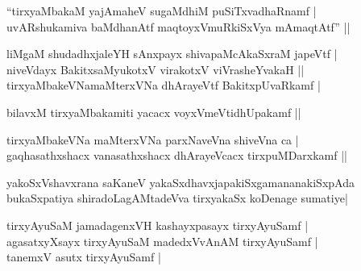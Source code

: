 \begin{entry}
\begin{shl}
``tirxyaMbakaM yajAmaheV sugaMdhiM puSiTxvadhaRnamf |\\
uvARshukamiva baMdhanAtf maqtoyxVmuRkiSxVya mAmaqtAtf'' ||
\end{shl}
\begin{shl}
liMgaM shudadhxjaleYH sAnxpayx shivapaMcAkaSxraM japeVtf |\\
niveVdayx BakitxsaMyukotxV virakotxV viVrasheYvakaH ||\\
tirxyaMbakeVNamaMterxVNa dhArayeVtf BakitxpUvaRkamf |
\end{shl}
\begin{shl}
bilavxM tirxyaMbakamiti yacacx voyxVmeVtidhUpakamf ||
\end{shl}
\begin{shl}
tirxyaMbakeVNa maMterxVNa parxNaveVna shiveVna ca |\\
gaqhasathxshacx vanasathxshacx dhArayeVcacx tirxpuMDarxkamf ||
\end{shl}
\end{entry}

\begin{entry}
\begin{shl}
yakoSxVshavxrana saKaneV yakaSxdhavxjapakiSxgamananakiSxpAda\\
bukaSxpatiya shiradoLagAMtadeVva tirxyakaSx koDenage sumatiye|
\end{shl}
\end{entry}

\begin{entry}
\begin{shl}
tirxyAyuSaM jamadagenxVH kashayxpasayx tirxyAyuSamf |\\
agasatxyXsayx tirxyAyuSaM madedxVvAnAM tirxyAyuSamf |\\
tanemxV asutx tirxyAyuSamf |
\end{shl}
\end{entry}

